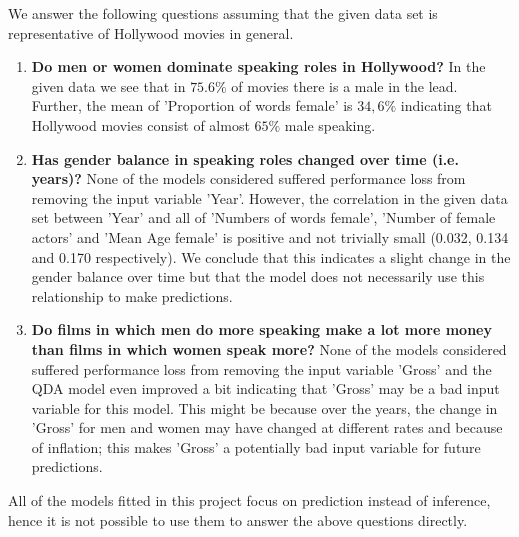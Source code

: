 \documentclass[../../project.tex]{subfiles}
\begin{document}
    We answer the following questions assuming that the given data set is representative of Hollywood movies in general.
\begin{enumerate}
    \item \textbf{Do men or women dominate speaking roles in Hollywood?} In the given data we see that in $75.6\%$ of movies there is a male in the lead. Further, the mean of 'Proportion of words female' is $34,6\%$ indicating that Hollywood movies consist of almost $65\%$ male speaking.
    
    \item \textbf{Has gender balance in speaking roles changed over time (i.e. years)?} None of the models considered suffered performance loss from removing the input variable 'Year'. However, the correlation in the given data set between 'Year' and all of 'Numbers of words female', 'Number of female actors' and 'Mean Age female' is positive and not trivially small (0.032, 0.134 and 0.170 respectively). We conclude that this indicates a slight change in the gender balance over time but that the model does not necessarily use this relationship to make predictions.
   
    \item \textbf{Do films in which men do more speaking make a lot more money than films in which women speak more?} None of the models considered suffered performance loss from removing the input variable 'Gross' and the QDA model even improved a bit indicating that 'Gross' may be a bad input variable for this model. This might be because over the years, the change in 'Gross' for men and women may have changed at different rates and because of inflation; this makes 'Gross' a potentially bad input variable for future predictions.
\end{enumerate}
	
All of the models fitted in this project focus on prediction instead of inference, hence it is not possible to use them to answer the above questions directly.
    
\end{document}
